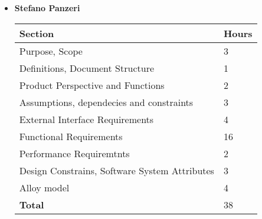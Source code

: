 \begin{itemize}
\item \textbf{Stefano Panzeri}

\begin{table}[!h]
\centering
\begin{tabular}{|l|l|}
\hline
 \textbf{Section}														&		\textbf{Hours}  \\ \hline
Purpose, Scope														& 		3 	\\ \hline
Definitions, Document Structure							& 		1 	\\ \hline
Product Perspective and Functions						& 		2 	\\ \hline
Assumptions, dependecies and constraints			&  	3	\\ \hline
External Interface Requirements							& 		4 	\\ \hline
Functional Requirements										& 		16 	\\ \hline
Performance Requiremtnts									&  	2	\\ \hline
Design Constrains, Software System Attributes	&  	3	\\ \hline
Alloy model   															&   	4    \\ \hline
\textbf{Total}															& 		38 	\\ \hline
\end{tabular}
\end{table}


\end{itemize}
